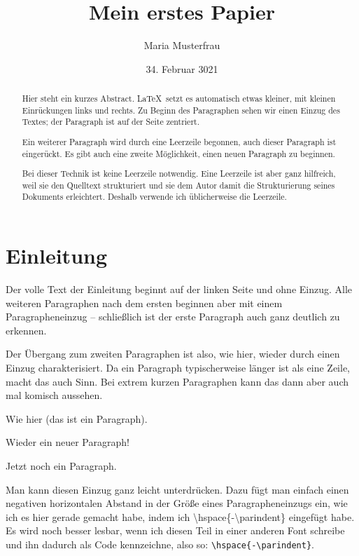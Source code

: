 \documentclass{article}
\author{Maria Musterfrau}
\title{Mein erstes Papier}
\date{34. Februar 3021}
\begin{document}
\maketitle

\begin{abstract}
Hier steht ein kurzes Abstract. \LaTeX\ setzt es automatisch etwas kleiner, mit kleinen Einrückungen links und
rechts. Zu Beginn des Paragraphen sehen wir einen Einzug des Textes; der Paragraph ist auf der Seite zentriert.

Ein weiterer Paragraph wird durch eine Leerzeile begonnen, auch dieser Paragraph ist eingerückt. Es
gibt auch eine zweite Möglichkeit, einen neuen Paragraph zu beginnen. \par Bei dieser Technik
ist keine Leerzeile notwendig.
Eine Leerzeile ist aber ganz hilfreich, weil sie den Quelltext strukturiert und sie dem Autor damit
die Strukturierung seines Dokuments erleichtert. Deshalb verwende ich üblicherweise die Leerzeile.

\end{abstract}

\section{Einleitung}

Der volle Text der Einleitung beginnt auf der linken Seite und ohne Einzug. Alle weiteren
Paragraphen nach dem ersten beginnen aber mit einem Paragrapheneinzug -- schließlich ist der
erste Paragraph auch ganz deutlich zu erkennen.

Der Übergang zum zweiten Paragraphen ist also, wie hier, wieder durch einen
Einzug charakterisiert. Da ein Paragraph typischerweise länger ist als eine Zeile, macht das auch Sinn.
Bei extrem kurzen Paragraphen kann das dann aber auch mal komisch aussehen.

Wie hier (das ist ein Paragraph).

Wieder ein neuer Paragraph!

Jetzt noch ein Paragraph.

\hspace{-\parindent} Man kann diesen Einzug ganz leicht unterdrücken. Dazu fügt man einfach
einen negativen horizontalen Abstand in der Größe eines Paragrapheneinzugs ein, wie ich es hier gerade
gemacht habe, indem ich \textbackslash hspace\{-\textbackslash parindent\} eingefügt habe.
Es wird noch besser lesbar, wenn ich diesen Teil in einer anderen Font schreibe und ihn
dadurch als Code kennzeichne, also so: \texttt{\textbackslash hspace\{-\textbackslash parindent\}}.
\end{document}
